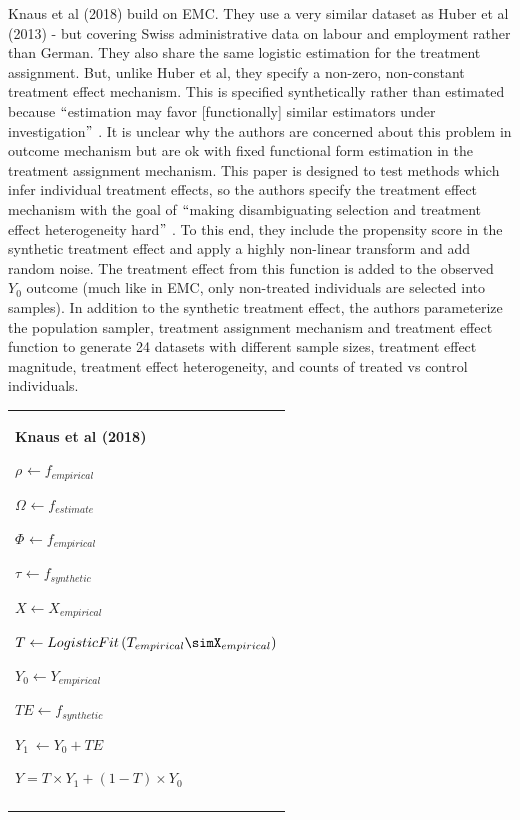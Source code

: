 \documentclass[../main.tex]{subfiles}
\begin{document}
\vspace{\baselineskip}
Knaus et al (2018) build on EMC. They use a very similar dataset as Huber et al (2013) - but covering Swiss administrative data on labour and employment rather than German. They also share the same logistic estimation for the treatment assignment. But, unlike Huber et al, they specify a non-zero, non-constant treatment effect mechanism. This is specified synthetically rather than estimated because $``$estimation may favor [functionally] similar estimators under investigation$"$ . It is unclear why the authors are concerned about this problem in outcome mechanism but are ok with fixed functional form estimation in the treatment assignment mechanism. This paper is designed to test methods which infer individual treatment effects, so the authors specify the treatment effect mechanism with the goal of $``$making disambiguating selection and treatment effect heterogeneity hard$"$ . To this end, they include the propensity score in the synthetic treatment effect and apply a highly non-linear transform and add random noise. The treatment effect from this function is added to the observed  \( Y_{0} \) outcome (much like in EMC, only non-treated individuals are selected into samples). In addition to the synthetic treatment effect, the authors parameterize the population sampler, treatment assignment mechanism and treatment effect function to generate 24 datasets with different sample sizes, treatment effect magnitude, treatment effect heterogeneity, and counts of treated vs control individuals.\par


\vspace{\baselineskip}

\vspace{\baselineskip}




\begin{table}[H]
 			\centering
\begin{tabular}{p{3.14in}}
\hline
\multicolumn{1}{|p{3.14in}|}{\textbf{Knaus et al (2018)} \par  \(  \rho _{} \leftarrow f_{empirical}~ \)  \par  \(  \Omega _{} \leftarrow f_{estimate} \)  \par  \(  \Phi _{} \leftarrow f_{empirical} \)  \par  \(  \tau_{} \leftarrow f_{synthetic}~ \)  \par  \( X \leftarrow X_{empirical} \)  \par  \( T \leftarrow LogisticFit \left(  T_{empirical}\simX_{empirical} \right)  \)  \par  \( Y_{0} \leftarrow Y_{empirical} \)  \par  \( TE \leftarrow f_{synthetic} \)  \par  \( Y_{1}~ \leftarrow Y_{0}+ TE \)  \par  \( Y = T \times Y_{1}+  \left( 1-T \right)  \times Y_{0} \)  \par } \\
\hhline{-}

\end{tabular}
 \end{table}
\end{document}
